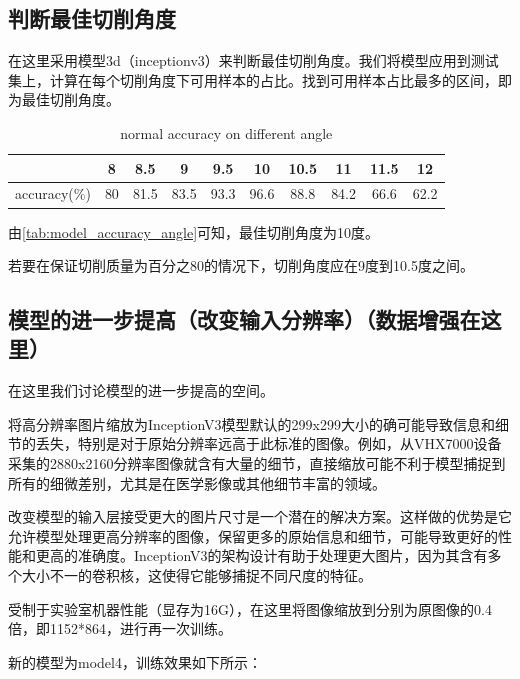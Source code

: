 \subsection{判断最佳切削角度}

在这里采用模型3d（inceptionv3）来判断最佳切削角度。我们将模型应用到测试集上，计算在每个切削角度下可用样本的占比。找到可用样本占比最多的区间，即为最佳切削角度。

\begin{table}[H]
    \centering
    \caption{normal accuracy on different angle}
    \begin{tabular}{cccccccccc}
        \toprule
        & 8 & 8.5 & 9 & 9.5 & 10 & 10.5 & 11 & 11.5 & 12 \\
        \midrule
        accuracy(\%) & 80 & 81.5 & 83.5 & 93.3 & 96.6 & 88.8 & 84.2 & 66.6 & 62.2 \\ 
        \bottomrule
    \end{tabular}
    \label{tab:model_accuracy_angle}
    \end{table}



由\autoref{tab:model_accuracy_angle}可知，最佳切削角度为10度。

若要在保证切削质量为百分之80的情况下，切削角度应在9度到10.5度之间。


\subsection{模型的进一步提高（改变输入分辨率）（数据增强在这里）}

在这里我们讨论模型的进一步提高的空间。

将高分辨率图片缩放为InceptionV3模型默认的299x299大小的确可能导致信息和细节的丢失，特别是对于原始分辨率远高于此标准的图像。例如，从VHX7000设备采集的2880x2160分辨率图像就含有大量的细节，直接缩放可能不利于模型捕捉到所有的细微差别，尤其是在医学影像或其他细节丰富的领域。

改变模型的输入层接受更大的图片尺寸是一个潜在的解决方案。这样做的优势是它允许模型处理更高分辨率的图像，保留更多的原始信息和细节，可能导致更好的性能和更高的准确度。InceptionV3的架构设计有助于处理更大图片，因为其含有多个大小不一的卷积核，这使得它能够捕捉不同尺度的特征。

受制于实验室机器性能（显存为16G），在这里将图像缩放到分别为原图像的0.4倍，即1152*864，进行再一次训练。

新的模型为model4，训练效果如下所示：

